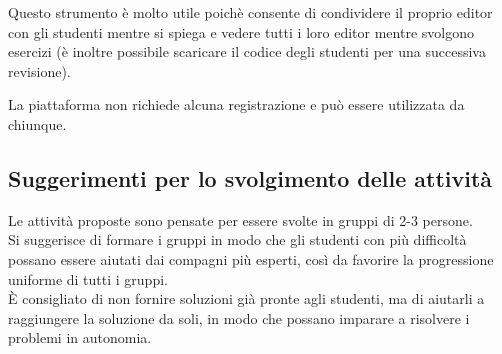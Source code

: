 \documentclass[../../docenti.tex]{subfiles}
\begin{document}
Questo strumento è molto utile poichè consente di condividere il proprio editor con gli studenti mentre si spiega e vedere tutti i loro editor mentre svolgono esercizi (è inoltre possibile scaricare il codice degli studenti per una successiva revisione).

La piattaforma non richiede alcuna registrazione e può essere utilizzata da chiunque.

\subsection{Suggerimenti per lo svolgimento delle attività}
Le attività proposte sono pensate per essere svolte in gruppi di 2-3 persone.\\
Si suggerisce di formare i gruppi in modo che gli studenti con più difficoltà possano essere aiutati dai compagni più esperti, così da favorire la progressione uniforme di tutti i gruppi.\\
È consigliato di non fornire soluzioni già pronte agli studenti, ma di aiutarli a raggiungere la soluzione da soli, in modo che possano imparare a risolvere i problemi in autonomia.
\end{document}
